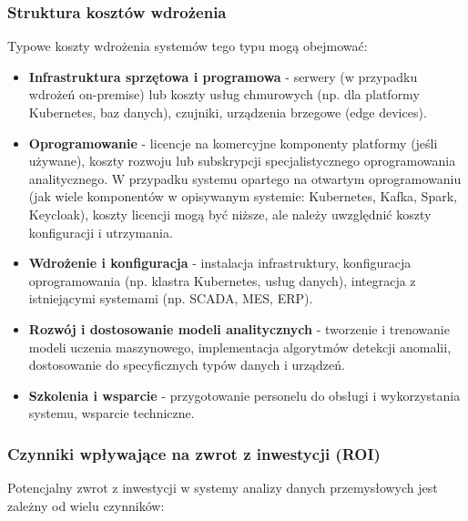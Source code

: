 \subsubsection{Struktura kosztów wdrożenia}
\label{subsubsec:struktura_kosztow}

Typowe koszty wdrożenia systemów tego typu mogą obejmować:

\begin{itemize}
    \item \textbf{Infrastruktura sprzętowa i programowa} - serwery (w przypadku wdrożeń on-premise) lub koszty usług chmurowych (np. dla platformy Kubernetes, baz danych), czujniki, urządzenia brzegowe (edge devices).
    \item \textbf{Oprogramowanie} - licencje na komercyjne komponenty platformy (jeśli używane), koszty rozwoju lub subskrypcji specjalistycznego oprogramowania analitycznego. W przypadku systemu opartego na otwartym oprogramowaniu (jak wiele komponentów w opisywanym systemie: Kubernetes, Kafka, Spark, Keycloak), koszty licencji mogą być niższe, ale należy uwzględnić koszty konfiguracji i utrzymania.
    \item \textbf{Wdrożenie i konfiguracja} - instalacja infrastruktury, konfiguracja oprogramowania (np. klastra Kubernetes, usług danych), integracja z istniejącymi systemami (np. SCADA, MES, ERP).
    \item \textbf{Rozwój i dostosowanie modeli analitycznych} - tworzenie i trenowanie modeli uczenia maszynowego, implementacja algorytmów detekcji anomalii, dostosowanie do specyficznych typów danych i urządzeń.
    \item \textbf{Szkolenia i wsparcie} - przygotowanie personelu do obsługi i wykorzystania systemu, wsparcie techniczne.
\end{itemize}

\subsubsection{Czynniki wpływające na zwrot z inwestycji (ROI)}
\label{subsubsec:analiza_roi}

Potencjalny zwrot z inwestycji w systemy analizy danych przemysłowych jest zależny od wielu czynników:

